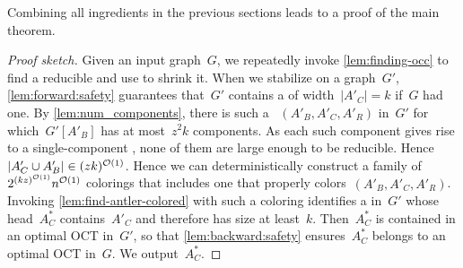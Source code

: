 
Combining all ingredients in the previous sections leads to a proof of the main theorem.

\thmMain*
\begin{proof}[Proof sketch]
Given an input graph~$G$, we repeatedly invoke \cref{lem:finding-occ} to find a reducible \occ and use  to shrink it. When we stabilize on a graph~$G'$, \cref{lem:forward:safety} guarantees that~$G'$ contains a \zocc of width~$|A'_C| = k$ if~$G$ had one. By \cref{lem:num_components}, there is such a \zocc~$(A'_B, A'_C, A'_R)$ in~$G'$ for which~$G'[A'_B]$ has at most~$z^2 k$ components. As each such component gives rise to a single-component \occ, none of them are large enough to be reducible. Hence~$|A'_C \cup A'_B| \in (zk)^{\mathcal{O}(1)}$. Hence we can deterministically construct a family of~$2^{(kz)^{\mathcal{O}(1)}} n^{\mathcal{O}(1)}$ colorings that includes one that properly colors~$(A'_B, A'_C, A'_R)$. Invoking \cref{lem:find-antler-colored} with such a coloring identifies a \zocc in~$G'$ whose head~$A^*_C$ contains~$A'_C$ and therefore has size at least~$k$. Then~$A^*_C$ is contained in an optimal OCT in~$G'$, so that \cref{lem:backward:safety} ensures~$A^*_C$ belongs to an optimal OCT in~$G$. We output~$A^*_C$.
\end{proof}